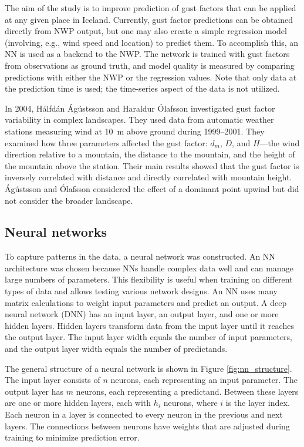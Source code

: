 The aim of the study is to improve prediction of gust factors that can be applied at any given place in Iceland. Currently, gust factor predictions can be obtained directly from NWP output, but one may also create a simple regression model (involving, e.g., wind speed and location) to predict them. To accomplish this, an NN is used as a backend to the NWP. The network is trained with gust factors from observations as ground truth, and model quality is measured by comparing predictions with either the NWP or the regression values. Note that only data at the prediction time is used; the time-series aspect of the data is not utilized.

In 2004, Hálfdán Ágústsson and Haraldur Ólafsson \cite{mean_gust_HA_HO} investigated gust factor variability in complex landscapes. They used data from automatic weather stations measuring wind at 10~m above ground during 1999–2001. They examined how three parameters affected the gust factor: \(d_m\), \(D\), and \(H\)—the wind direction relative to a mountain, the distance to the mountain, and the height of the mountain above the station. Their main results showed that the gust factor is inversely correlated with distance and directly correlated with mountain height. Ágústsson and Ólafsson considered the effect of a dominant point upwind but did not consider the broader landscape.

\subsection{Neural networks}
To capture patterns in the data, a neural network was constructed. An NN architecture was chosen because NNs handle complex data well and can manage large numbers of parameters. This flexibility is useful when training on different types of data and allows testing various network designs. An NN uses many matrix calculations to weight input parameters and predict an output. A deep neural network (DNN) has an input layer, an output layer, and one or more hidden layers. Hidden layers transform data from the input layer until it reaches the output layer. The input layer width equals the number of input parameters, and the output layer width equals the number of predictands.

The general structure of a neural network is shown in Figure \ref{fig:nn_structure}. The input layer consists of $n$ neurons, each representing an input parameter. The output layer has $m$ neurons, each representing a predictand. Between these layers are one or more hidden layers, each with $h_i$ neurons, where $i$ is the layer index. Each neuron in a layer is connected to every neuron in the previous and next layers. The connections between neurons have weights that are adjusted during training to minimize prediction error.

